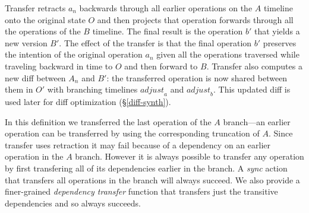 \documentclass[english,submission]{programming}
\theoremstyle{definition}
\newcommand{\mathbox}[1]{\colorbox{black!10}{$#1$\phantom{i\hspace{-3.5pt}}}}
\begin{document}
Transfer
retracts \mathbox{a_n} backwards through all earlier operations on the \mathbox{A} timeline onto the original state \mathbox{O} and then projects that operation forwards through all the operations of the \mathbox{B} timeline. The final result is the operation \mathbox{b'} that yields a new version \mathbox{B'}. The effect of the transfer is that the final operation \mathbox{b'} preserves the intention of the original operation \mathbox{a_n} given all the operations traversed while traveling backward in time to \mathbox{O} and then forward to \mathbox{B}. Transfer also computes a new diff between \mathbox{A_n} and \mathbox{B'}: the transferred operation is now shared between them in \mathbox{O'} with branching timelines \mathbox{\mathit{adjust}_a} and \mathbox{\mathit{adjust}_b}. This updated diff is used later for diff optimization (\S\ref{diff-synth}).

In this definition we transferred the last operation of the \mathbox{A} branch---an earlier operation can be transferred by using the corresponding truncation of \mathbox{A}.
Since transfer uses retraction it may fail because of a dependency on an earlier operation in the \mathbox{A} branch. However it is always possible to transfer any operation by first transfering all of its dependencies earlier in the branch. A \textit{sync} action that transfers all operations in the branch will always succeed. We also provide a finer-grained \textit{dependency transfer} function that transfers just the transitive dependencies and so always succeeds.
\end{document}
